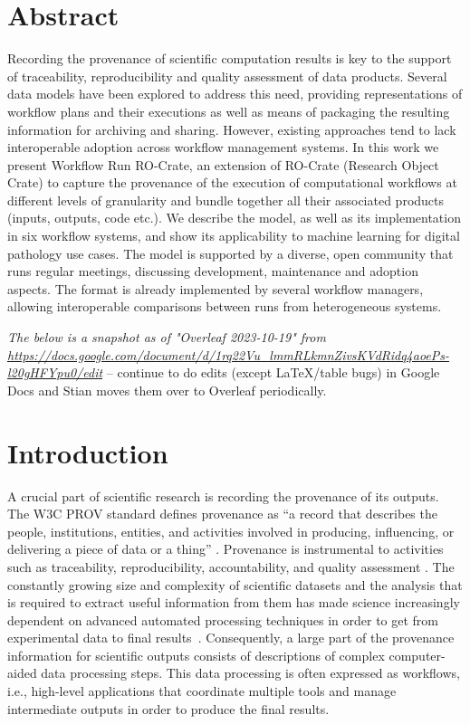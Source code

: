 \documentclass[10pt,letterpaper]{article}
\begin{document}
\section*{Abstract}
Recording the provenance of scientific computation results is
key to the support of traceability, reproducibility and quality
assessment of data products. Several data models have been explored to
address this need, providing representations of workflow plans and their
executions as well as means of packaging the resulting information for
archiving and sharing. However, existing approaches tend to lack interoperable adoption across workflow management systems. In this work we present
Workflow Run RO-Crate, an extension of RO-Crate (Research Object Crate)
to capture the provenance of the execution of computational workflows at
different levels of granularity and bundle together all their associated products (inputs, outputs, code etc.). We describe the model, as well as its
implementation in six workflow systems, and show its applicability to
machine learning for digital pathology use cases. The model is supported
by a diverse, open community that runs regular meetings, discussing
development, maintenance and adoption  aspects. The format is already implemented by
several workflow managers, allowing interoperable
comparisons between runs from heterogeneous systems.


\linenumbers



\emph{The below is a snapshot as of "Overleaf 2023-10-19" from
\url{https://docs.google.com/document/d/1rq22Vu_lmmRLkmnZivsKVdRidq4aoePs-l20gHFYpu0/edit}} -- continue to do edits (except LaTeX/table bugs) in Google Docs and Stian moves them over to Overleaf periodically.

\section{Introduction}\label{introduction}

A crucial part of scientific research is recording the provenance of its outputs.
The W3C PROV standard defines provenance as ``a record that describes the people, institutions, entities, and activities involved in producing, influencing, or delivering a piece of data or a thing''
\cite{Moreau 2013}.
Provenance is instrumental to activities such as traceability, reproducibility, accountability, and quality assessment
\cite{Herschel 2017}.
The constantly growing size and complexity of scientific datasets and the analysis that is required to extract useful information from them has made science increasingly dependent on advanced automated processing techniques in order to get from experimental data to final results~\cite{Himanen 2019, Gauthier 2019, Huntingford 2019}.
Consequently, a large part of the provenance information for scientific outputs consists of descriptions of complex computer-aided data processing steps. This data processing is often expressed as workflows, i.e., high-level applications that coordinate multiple tools and manage intermediate outputs in order to produce the final results.
\end{document}
